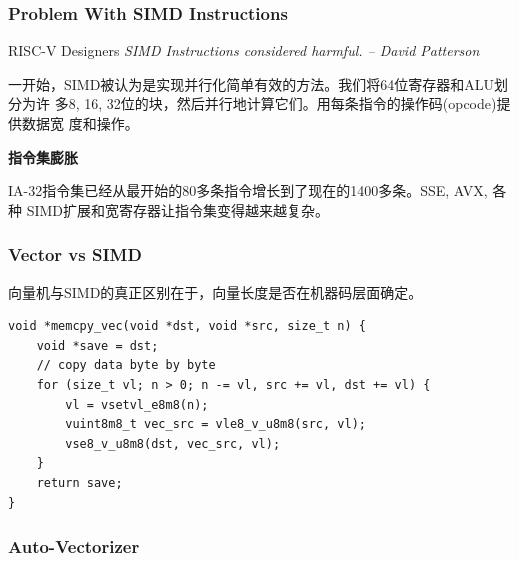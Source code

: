 \documentclass[aspectratio=169]{ctexbeamer}
\begin{document}
\begin{frame}
    \frametitle{Problem With SIMD Instructions}

    \begin{block}{RISC-V Designers}
        \textit{SIMD Instructions considered harmful. -- David Patterson}
    \end{block}

    一开始，SIMD被认为是实现并行化简单有效的方法。我们将64位寄存器和ALU划分为许
    多8, 16, 32位的块，然后并行地计算它们。用每条指令的操作码(opcode)提供数据宽
    度和操作。

    \textbf{指令集膨胀}

    IA-32指令集已经从最开始的80多条指令增长到了现在的1400多条。SSE, AVX, 各种
    SIMD扩展和宽寄存器让指令集变得越来越复杂。
\end{frame}

\begin{frame}[fragile]
    \frametitle{Vector vs SIMD}

    向量机与SIMD的真正区别在于，向量长度是否在机器码层面确定。

    \begin{lstlisting}
void *memcpy_vec(void *dst, void *src, size_t n) {
    void *save = dst;
    // copy data byte by byte
    for (size_t vl; n > 0; n -= vl, src += vl, dst += vl) {
        vl = vsetvl_e8m8(n);
        vuint8m8_t vec_src = vle8_v_u8m8(src, vl);
        vse8_v_u8m8(dst, vec_src, vl);
    }
    return save;
}
    \end{lstlisting}


\end{frame}

\begin{frame}
    \frametitle{Auto-Vectorizer}



\end{frame}
\end{document}
